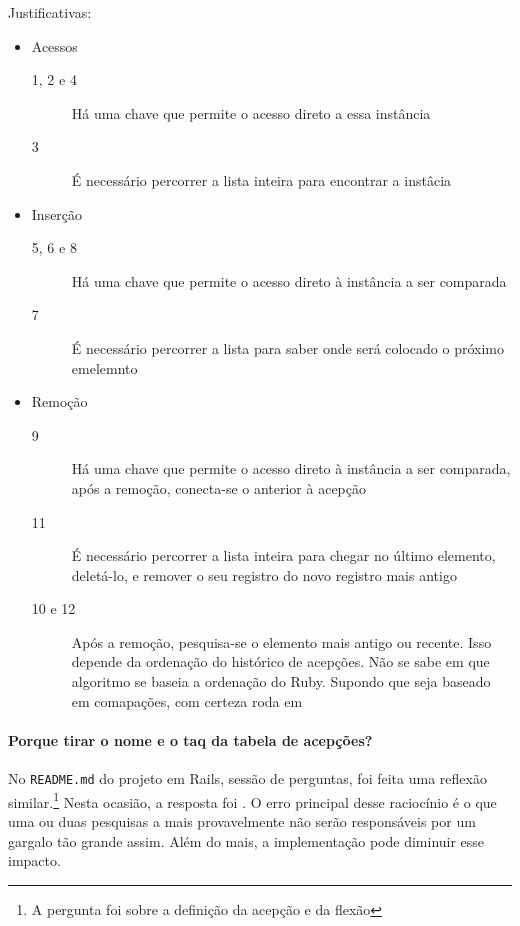 Justificativas:
\begin{itemize}
    \item Acessos
    \begin{description}
        \item[1, 2 e 4] Há uma chave que permite o acesso direto a essa instância
        \item[3] É necessário percorrer a lista inteira para encontrar a instâcia
    \end{description}
    \item Inserção
    \begin{description}
        \item[5, 6 e 8] Há uma chave que permite o acesso direto à instância a ser comparada
        \item[7] É necessário percorrer a lista para saber onde será colocado o próximo emelemnto
    \end{description}
    \item Remoção
    \begin{description}
        \item[9] Há uma chave que permite o acesso direto à instância a ser comparada, após a remoção,
        conecta-se o anterior à acepção
        \item[11] É necessário percorrer a lista inteira para chegar no último elemento, deletá-lo, e
        remover o seu registro do novo registro mais antigo
        \item[10 e 12] Após a remoção, pesquisa-se o elemento mais antigo ou recente. Isso depende da ordenação
        do histórico de acepções. Não se sabe em que algoritmo se baseia a ordenação do Ruby. Supondo que
        seja baseado em comapações, com certeza roda em 
    \end{description}
\end{itemize}

\paragraph{Porque tirar o nome e o taq da tabela de acepções?}

No \texttt{README.md} do projeto em Rails, sessão de perguntas, foi feita uma reflexão similar.\footnote{A
pergunta foi sobre a definição da acepção e da flexão} Nesta ocasião, a resposta foi . O erro principal desse raciocínio é o que uma ou duas pesquisas a mais provavelmente
não serão responsáveis por um gargalo tão grande assim. Além do mais, a implementação pode diminuir esse impacto.

